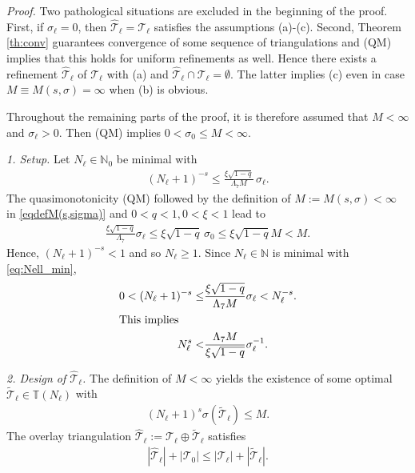 \documentclass{siamltex1213}
\begin{document}
\textit{Proof.}
Two pathological situations are excluded in the beginning of the proof. 
First, if  $\sigma_\ell=0$, then ${\hat{\mathcal{T}}_{\ell}}={\mathcal T_{\ell}}$ satisfies the assumptions (a)-(c).
Second, Theorem \ref{th:conv} guarantees convergence of some sequence of triangulations and (QM) 
implies that this holds for uniform refinements as well. Hence there exists a refinement 
${\hat{\mathcal{T}}_{\ell}}$ of ${\mathcal T_{\ell}}$ with (a) and ${\hat{\mathcal{T}}_{\ell}}\cap{\mathcal T_{\ell}}=\emptyset$. The latter implies (c)
even in case  $M\equiv M(s,\sigma)=\infty$ when (b) is obvious. 

Throughout the remaining parts of the proof, it is therefore assumed that $M<\infty$ and 
$\sigma_\ell>0$. Then (QM)  implies $0<\sigma_{0}\leq M<\infty$.

	\textit{1. Setup.}
	Let $N_\ell \in {\mathbb{N}_0}$ be minimal with 
	\begin{align}\label{eq:Nell_min}
		(N_\ell+1)^{-s} \leq \frac{\xi \sqrt{1-q}}{{\ensuremath{\Lambda_{\mathrm{7}}}} M}\, \sigma_\ell.
	\end{align}
	The quasimonotonicity (QM) followed by the definition of 
	 $M:=M(s,\sigma)<\infty$ in \eqref{eqdefM(s,sigma)} and $0<q<1,0<\xi<1$ lead to
	\begin{align*}
		\frac{\xi\sqrt{1-q}}{\ensuremath{\Lambda_{\mathrm{7}}}} \sigma_{\ell} \leq \xi \sqrt{1-q} \, \sigma_0 \leq \xi \sqrt{1-q} M < M.	
	\end{align*}
	Hence, $(N_\ell+1)^{-s}<1$ and so $N_\ell\geq 1$.
		Since $N_\ell \in \mathbb N$ is minimal with \eqref{eq:Nell_min},
	\begin{align}\notag 
		0<(N_\ell+1)^{-s}\leq& \frac{\xi\sqrt{1-q}}{{\ensuremath{\Lambda_{\mathrm{7}}}} M} \sigma_\ell < N_\ell^{-s}.\\
		\intertext{This implies}\label{eq:invNMinimal}
		N_\ell^s < &\frac{{\ensuremath{\Lambda_{\mathrm{7}}}} M}{\xi\sqrt{1-q}} \sigma_\ell^{-1}.
	\end{align}
	
	\textit{2. Design of ${\hat{\mathcal{T}}_{\ell}}$.}
	The definition of $M<\infty$  yields the existence of some optimal ${\tilde{\mathcal{T}}_{\ell}} \in {\mathbb T\left({N_\ell}\right)}$ with 
	\begin{align} \label{eq:lowM}
		\left( N_\ell+1 \right)^s \sigma({\tilde{\mathcal{T}}_{\ell}}) \leq M.
	\end{align}
	The overlay triangulation ${\hat{\mathcal{T}}_{\ell}}:= {\mathcal T_{\ell}} \oplus {\tilde{\mathcal{T}}_{\ell}}$ \cite{CKNS07,Stev07} satisfies
	\begin{align}\label{eq:overlay}
		{\left\lvert {{\hat{\mathcal{T}}_{\ell}}} \right\rvert} + {\left\lvert {{\mathcal T_{0}}} \right\rvert} \leq {\left\lvert {{\mathcal T_{\ell}}} \right\rvert} + {\left\lvert {{\tilde{\mathcal{T}}_{\ell}}} \right\rvert}.
	\end{align}
\end{document}
